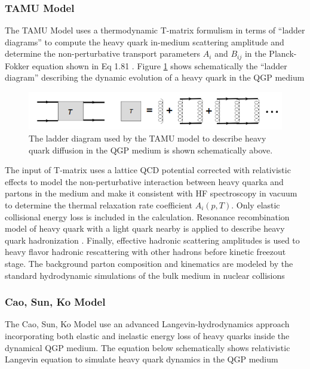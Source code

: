 \subsubsection{TAMU Model}

The TAMU Model uses a thermodynamic T-matrix formulism in terms of ``ladder diagrams'' to compute the heavy quark in-medium scattering amplitude and determine the non-perturbative transport parameters $A_i$ and $B_{ij}$ in the Planck-Fokker equation shown in Eq 1.81 \cite{TAMUModel}. Figure \ref{LadderDiagram} shows schematically the ``ladder diagram'' describing the dynamic evolution of a heavy quark in the QGP medium 

 \begin{figure}[hbtp]
\begin{center}
\includegraphics[width=1.0\textwidth]{Figures/Chapter1/LadderDiagram.png}
\caption{The ladder diagram used by the TAMU model to describe heavy quark diffusion in the QGP medium is shown schematically above.}
\label{LadderDiagram}
\end{center}
\end{figure}  

The input of T-matrix uses a lattice QCD potential \cite{LQCDTAMU} corrected with relativistic effects to model the non-perturbative interaction between heavy quarka and partons in the medium and make it consistent with HF spectroscopy in vacuum to determine the thermal relaxation rate coefficient $A_i(p,T)$. Only elastic collisional energy loss is included in the calculation. Resonance recombination model of heavy quark with a light quark nearby is applied to describe heavy quark hadronization \cite{RRM1}. Finally, effective hadronic scattering amplitudes is used to heavy flavor hadronic rescattering with other hadrons before kinetic freezout stage. The background parton composition and kinematics are modeled by the standard hydrodynamic simulations of the bulk medium in nuclear collisions

\subsubsection{Cao, Sun, Ko Model}

The Cao, Sun, Ko Model use an advanced Langevin-hydrodynamics approach \cite{CaoLH1,CaoLH2} incorporating both elastic and inelastic energy loss of heavy quarks inside the dynamical QGP medium. The equation below schematically shows relativistic Langevin equation to simulate heavy quark dynamics in the QGP medium


